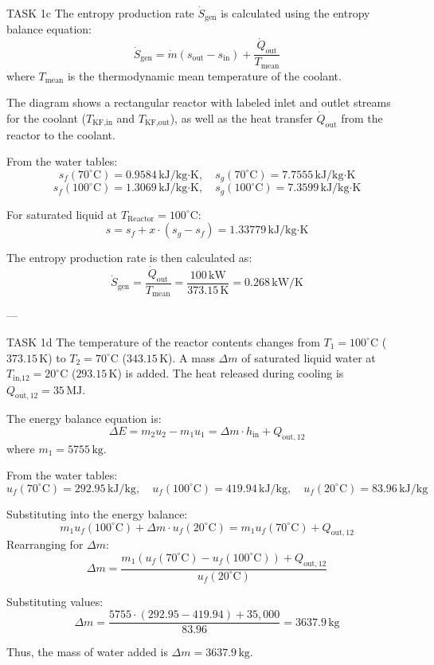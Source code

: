 TASK 1c  
The entropy production rate \( \dot{S}_{\text{gen}} \) is calculated using the entropy balance equation:  
\[
\dot{S}_{\text{gen}} = \dot{m} \left( s_{\text{out}} - s_{\text{in}} \right) + \frac{\dot{Q}_{\text{out}}}{T_{\text{mean}}}
\]  
where \( T_{\text{mean}} \) is the thermodynamic mean temperature of the coolant.  

The diagram shows a rectangular reactor with labeled inlet and outlet streams for the coolant (\( T_{\text{KF,in}} \) and \( T_{\text{KF,out}} \)), as well as the heat transfer \( \dot{Q}_{\text{out}} \) from the reactor to the coolant.  

From the water tables:  
\[
s_f(70^\circ\text{C}) = 0.9584 \, \text{kJ/kg·K}, \quad s_g(70^\circ\text{C}) = 7.7555 \, \text{kJ/kg·K}
\]  
\[
s_f(100^\circ\text{C}) = 1.3069 \, \text{kJ/kg·K}, \quad s_g(100^\circ\text{C}) = 7.3599 \, \text{kJ/kg·K}
\]  

For saturated liquid at \( T_{\text{Reactor}} = 100^\circ\text{C} \):  
\[
s = s_f + x \cdot (s_g - s_f) = 1.33779 \, \text{kJ/kg·K}
\]  

The entropy production rate is then calculated as:  
\[
\dot{S}_{\text{gen}} = \frac{\dot{Q}_{\text{out}}}{T_{\text{mean}}} = \frac{100 \, \text{kW}}{373.15 \, \text{K}} = 0.268 \, \text{kW/K}
\]  

---

TASK 1d  
The temperature of the reactor contents changes from \( T_1 = 100^\circ\text{C} \) (\( 373.15 \, \text{K} \)) to \( T_2 = 70^\circ\text{C} \) (\( 343.15 \, \text{K} \)). A mass \( \Delta m \) of saturated liquid water at \( T_{\text{in,12}} = 20^\circ\text{C} \) (\( 293.15 \, \text{K} \)) is added. The heat released during cooling is \( Q_{\text{out},12} = 35 \, \text{MJ} \).  

The energy balance equation is:  
\[
\Delta E = m_2 u_2 - m_1 u_1 = \Delta m \cdot h_{\text{in}} + Q_{\text{out},12}
\]  
where \( m_1 = 5755 \, \text{kg} \).  

From the water tables:  
\[
u_f(70^\circ\text{C}) = 292.95 \, \text{kJ/kg}, \quad u_f(100^\circ\text{C}) = 419.94 \, \text{kJ/kg}, \quad u_f(20^\circ\text{C}) = 83.96 \, \text{kJ/kg}
\]  

Substituting into the energy balance:  
\[
m_1 u_f(100^\circ\text{C}) + \Delta m \cdot u_f(20^\circ\text{C}) = m_1 u_f(70^\circ\text{C}) + Q_{\text{out},12}
\]  
Rearranging for \( \Delta m \):  
\[
\Delta m = \frac{m_1 \left( u_f(70^\circ\text{C}) - u_f(100^\circ\text{C}) \right) + Q_{\text{out},12}}{u_f(20^\circ\text{C})}
\]  

Substituting values:  
\[
\Delta m = \frac{5755 \cdot (292.95 - 419.94) + 35,000}{83.96} = 3637.9 \, \text{kg}
\]  

Thus, the mass of water added is \( \Delta m = 3637.9 \, \text{kg} \).